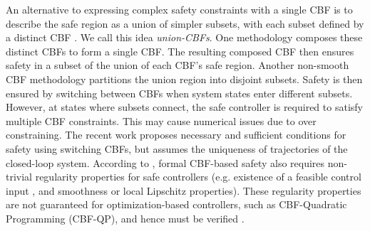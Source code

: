\documentclass[letterpaper, 10 pt, conference]{ieeeconf}  %
\begin{document}
An alternative to expressing complex safety constraints with a single CBF is to describe the safe region as a union of simpler subsets, with each subset defined by a distinct CBF \cite{vahs2024non, glotfelter2020nonsmooth}. We call this idea \textit{union-CBFs}. 
One methodology \cite{molnar2023composing} composes these distinct CBFs to form a single CBF. The resulting composed CBF then ensures safety in a subset of the union of each CBF's safe region. Another non-smooth CBF methodology \cite{glotfelter2020nonsmooth, vahs2024non} partitions the union region into disjoint subsets. Safety is then ensured by switching between CBFs when system states enter different subsets. However, at states where subsets connect, the safe controller is required to satisfy multiple CBF constraints. This may cause numerical issues due to over constraining. The recent work \cite{long2025safety} proposes necessary and sufficient conditions for safety using switching CBFs, but assumes the uniqueness of trajectories of the closed-loop system. According to \cite{clark2021verification, mestres2025regularity}, formal CBF-based safety also requires non-trivial regularity properties for safe controllers (e.g. existence of a feasible control input \cite{clark2021verification}, and smoothness\cite{morris2015continuity} or local Lipschitz \cite{mestres2025regularity} properties). These regularity properties are not guaranteed for optimization-based controllers, such as CBF-Quadratic Programming\cite{ames2016control} (CBF-QP), and hence must be verified \cite{clark2021verification, zhang2023exact}.

\end{document}
